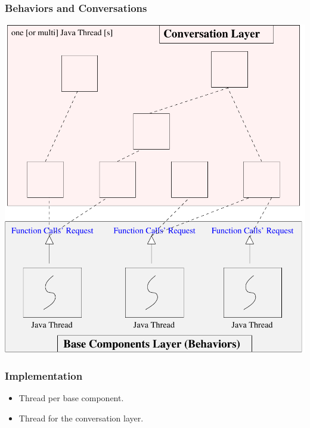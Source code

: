 \documentclass[compress,xcolor=dvipsnames,10pt]{beamer}
\begin{document}
\begin{frame}
 \frametitle{Behaviors and Conversations}
 \begin{center}
  \includegraphics[scale=0.45]{figs/javabip.pdf}
 \end{center}

\end{frame}



\begin{frame}[fragile]
 \frametitle{Implementation}
 \begin{itemize}
  \item Thread per base component.
  \item Thread for the conversation layer.
 \end{itemize}

\end{frame}
\end{document}
